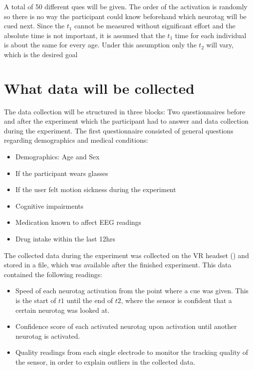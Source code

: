             A total of 50 different ques will be given. The order of the activation is randomly so there is no way the participant could know beforehand which neurotag will be cued next. Since the $t_{1}$ cannot be measured without significant effort and the absolute time is not important, it is assumed that the $t_{1}$ time for each individual is about the same for every age. Under this assumption only the $t_{2}$ will vary, which is the desired goal

        \section{What data will be collected}\label{datacollection}

            The data collection will be structured in three blocks: Two questionnaires before and after the experiment which the participant had to answer and data collection during the experiment. The first questionnaire consisted of general questions regarding demographics and medical conditions:

            \begin{itemize}
                \item Demographics: Age and Sex
                \item If the participant wears glasses
                \item If the user felt motion sickness during the experiment
                \item Cognitive impairments
                \item Medication known to affect EEG readings
                \item Drug intake within the last 12hrs
            \end{itemize}

            The collected data during the experiment was collected on the VR headset () and stored in a file, which was available after the finished experiment. This data contained the following readings:

            \begin{itemize}
                \item Speed of each neurotag activation from the point where a cue was given. This is the start of $t1$ until the end of $t2$, where the sensor is confident that a certain neurotag was looked at.
                \item Confidence score of each activated neurotag upon activation until another neurotag is activated.
                \item Quality readings from each single electrode to monitor the tracking quality of the sensor, in order to explain outliers in the collected data.
            \end{itemize}
            
